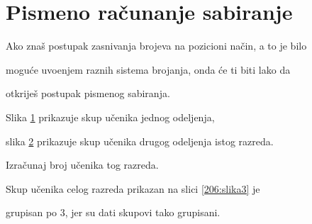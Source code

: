     \section{Pismeno ra\v cunanje sabiranje}

    \begin{zad}

        Ako zna\v s postupak zasnivanja brojeva na pozicioni na\v cin, a to je bilo

        mogu\' ce uvo\dj enjem raznih sistema brojanja, onda \' ce ti biti lako da

        otkrije\v s postupak pismenog sabiranja. %

        

        Slika \ref{r206:slika1} prikazuje skup u\v cenika jednog odeljenja,

        slika \ref{r206:slika2} prikazuje skup u\v cenika drugog odeljenja istog razreda.

        

        Izra\v cunaj broj u\v cenika tog razreda.

        

        \begin{figure}[H]

            \centering


            \caption{}

             \label{r206:slika1}

        \end{figure}

        \begin{figure}[H]

            \centering


            \caption{}

             \label{r206:slika2}

        \end{figure}



        Skup u\v cenika celog razreda prikazan na slici \ref{206:slika3} je

        grupisan po $3$, jer su dati skupovi tako grupisani.

        \begin{figure}[H]

            \centering


            \caption{}


\end{figure}
\end{zad}
